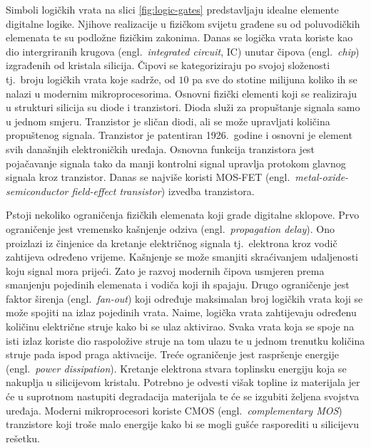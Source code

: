 \documentclass[times, utf8, diplomski]{fer}
\begin{document}
Simboli logičkih vrata na slici \ref{fig:logic-gates} predstavljaju idealne elemente digitalne logike. Njihove realizacije u fizičkom svijetu građene su od poluvodičkih elemenata te su podložne fizičkim zakonima. Danas se logička vrata koriste kao dio intergriranih krugova (engl.~\textit{integrated circuit}, IC) unutar čipova (engl.~\textit{chip}) izgrađenih od kristala silicija. Čipovi se kategoriziraju po svojoj složenosti tj.~broju logičkih vrata koje sadrže, od $10$ pa sve do stotine milijuna koliko ih se nalazi u modernim mikroprocesorima. Osnovni fizički elementi koji se realiziraju u strukturi silicija su diode i tranzistori. Dioda služi za propuštanje signala samo u jednom smjeru. Tranzistor je sličan diodi, ali se može upravljati količina propuštenog signala. Tranzistor je patentiran 1926.~godine i osnovni je element svih današnjih elektroničkih uređaja. Osnovna funkcija tranzistora jest pojačavanje signala tako da manji kontrolni signal upravlja protokom glavnog signala kroz tranzistor. Danas se najviše koristi MOS-FET (engl.~\textit{metal-oxide-semiconductor field-effect transistor}) izvedba tranzistora.

Pstoji nekoliko ograničenja fizičkih elemenata koji grade digitalne sklopove. Prvo ograničenje jest vremensko kašnjenje odziva (engl.~\textit{propagation delay}). Ono proizlazi iz činjenice da kretanje električnog signala tj.~elektrona kroz vodič zahtijeva određeno vrijeme. Kašnjenje se može smanjiti skraćivanjem udaljenosti koju signal mora prijeći. Zato je razvoj modernih čipova usmjeren prema smanjenju pojedinih elemenata i vodiča koji ih spajaju. Drugo ograničenje jest faktor širenja (engl.~\textit{fan-out}) koji određuje maksimalan broj logičkih vrata koji se može spojiti na izlaz pojedinih vrata. Naime, logička vrata zahtijevaju određenu količinu električne struje kako bi se ulaz aktivirao. Svaka vrata koja se spoje na isti izlaz koriste dio raspoložive struje na tom ulazu te u jednom trenutku količina struje pada ispod praga aktivacije. Treće ograničenje jest raspršenje energije (engl.~\textit{power dissipation}). Kretanje elektrona stvara toplinsku energiju koja se nakuplja u silicijevom kristalu. Potrebno je odvesti višak topline iz materijala jer će u suprotnom nastupiti degradacija materijala te će se izgubiti željena svojstva uređaja. Moderni mikroprocesori koriste CMOS (engl.~\textit{complementary MOS}) tranzistore koji troše malo energije kako bi se mogli gušće rasporediti u silicijevu rešetku.
\end{document}
